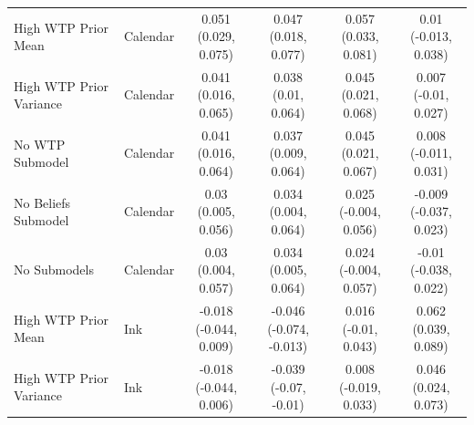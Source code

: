 \documentclass[
]{article}
\begin{document}
\begin{table}
{\begin{tabular}[t]{llcccc}
\midrule
High WTP Prior Mean & Calendar & \makecell[c]{0.051\\(0.029, 0.075)} & \makecell[c]{0.047\\(0.018, 0.077)} & \makecell[c]{0.057\\(0.033, 0.081)} & \makecell[c]{0.01\\(-0.013, 0.038)}\\
High WTP Prior Variance & Calendar & \makecell[c]{0.041\\(0.016, 0.065)} & \makecell[c]{0.038\\(0.01, 0.064)} & \makecell[c]{0.045\\(0.021, 0.068)} & \makecell[c]{0.007\\(-0.01, 0.027)}\\
No WTP Submodel & Calendar & \makecell[c]{0.041\\(0.016, 0.064)} & \makecell[c]{0.037\\(0.009, 0.064)} & \makecell[c]{0.045\\(0.021, 0.067)} & \makecell[c]{0.008\\(-0.011, 0.031)}\\
No Beliefs Submodel & Calendar & \makecell[c]{0.03\\(0.005, 0.056)} & \makecell[c]{0.034\\(0.004, 0.064)} & \makecell[c]{0.025\\(-0.004, 0.056)} & \makecell[c]{-0.009\\(-0.037, 0.023)}\\
No Submodels & Calendar & \makecell[c]{0.03\\(0.004, 0.057)} & \makecell[c]{0.034\\(0.005, 0.064)} & \makecell[c]{0.024\\(-0.004, 0.057)} & \makecell[c]{-0.01\\(-0.038, 0.022)}\\
\midrule
High WTP Prior Mean & Ink & \makecell[c]{-0.018\\(-0.044, 0.009)} & \makecell[c]{-0.046\\(-0.074, -0.013)} & \makecell[c]{0.016\\(-0.01, 0.043)} & \makecell[c]{0.062\\(0.039, 0.089)}\\
High WTP Prior Variance & Ink & \makecell[c]{-0.018\\(-0.044, 0.006)} & \makecell[c]{-0.039\\(-0.07, -0.01)} & \makecell[c]{0.008\\(-0.019, 0.033)} & \makecell[c]{0.046\\(0.024, 0.073)}\\

\end{tabular}}
\end{table}
\end{document}
